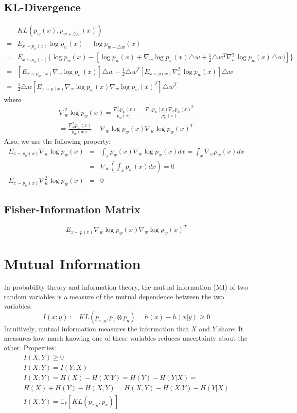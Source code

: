 \documentclass{article}
\begin{document}
\subsection{KL-Divergence}
\begin{eqnarray*}
&KL(p_w(x), p_{w+\triangle w}(x)) \\
=& E_{x\sim p_w(x)} \log p_w(x) - \log p_{w+\triangle w}(x)\\
=& E_{x\sim p_w(x)} \{\log p_w(x) - [\log p_w(x)+\nabla_w \log p_w(x)\triangle w + \frac{1}{2}\triangle w^T \nabla^2_w \log p_w(x)\triangle w)]\} \\
=& [E_{x\sim p_w(x)}\nabla_w \log p_w(x)]\triangle w -  \frac{1}{2}\triangle w^T [E_{x\sim p(x)}\nabla^2_w \log p_w(x)]\triangle w\\
= & \frac{1}{2}\triangle w[E_{x\sim p(x)}\nabla_w \log p_w(x)\nabla_w \log p_w(x)^T]\triangle w^T
\end{eqnarray*}
where
\begin{eqnarray*}
\nabla^2_w \log p_w(x) = \frac{\nabla^2_w p_w(x)}{p_w(x)} - \frac{\nabla_w p_w(x)\nabla_w p_w(x)^T}{p_w^2(x)} \\
= \frac{\nabla^2_w p_w(x)}{p_w(x)} - \nabla_w \log p_w(x)\nabla_w \log p_w(x)^T
\end{eqnarray*}
Also, we use the following property:
\begin{eqnarray*}
E_{x\sim p_w(x)}\nabla_w \log p_w(x) &=& \int_x p_w(x)\nabla_w \log p_w(x)dx=\int_x \nabla_w p_w(x)dx\\
&=&\nabla_w(\int_x  p_w(x)dx) = 0\\
E_{x\sim p_w(x)}\nabla^2_w \log p_w(x) &=& 0
\end{eqnarray*}
\subsection{Fisher-Information Matrix}
\begin{equation*}
E_{x\sim p(x)}\nabla_w \log p_w(x)\nabla_w \log p_w(x)^T
\end{equation*}

\section{Mutual Information}
In probability theory and information theory, the mutual information (MI) of two random variables is a measure of the mutual dependence between the two variables:
\begin{equation}
I(x;y) := KL(p_{x,y}, p_x \otimes p_y) = h(x) - h(x|y)\ge 0
\end{equation}
Intuitively, mutual information measures the information that $X$ and $Y$ share: It measures how much knowing one of these variables reduces uncertainty about the other.
Properties:
\begin{eqnarray}
I(X;Y)\ge 0\\
I(X;Y) = I(Y;X)\\
I(X;Y) = H(X) - H(X|Y) = H(Y) - H(Y|X) = \\
H(X)+H(Y)-H(X,Y) = H(X,Y)-H(X|Y)-H(Y|X)\\
I(X;Y)=\mathbb{E}_Y[KL(p_{x|y}, p_x)]
\end{eqnarray}
\end{document}
